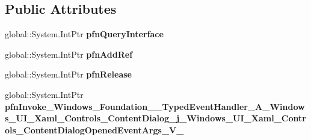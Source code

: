\subsection*{Public Attributes}
\begin{DoxyCompactItemize}
\item 
\mbox{\label{struct_windows_1_1_foundation_1_1_typed_event_handler___a___windows___u_i___xaml___controls___co7eff74cfd44b375ec88a14fae1c258be_aef7949bfc9371f66066b70f37583104c}} 
global\+::\+System.\+Int\+Ptr {\bfseries pfn\+Query\+Interface}
\item 
\mbox{\label{struct_windows_1_1_foundation_1_1_typed_event_handler___a___windows___u_i___xaml___controls___co7eff74cfd44b375ec88a14fae1c258be_a1665238f933bb5659d4d4dab1a7398eb}} 
global\+::\+System.\+Int\+Ptr {\bfseries pfn\+Add\+Ref}
\item 
\mbox{\label{struct_windows_1_1_foundation_1_1_typed_event_handler___a___windows___u_i___xaml___controls___co7eff74cfd44b375ec88a14fae1c258be_a6546c3c1c4ae39dadb502075cb8e2ec7}} 
global\+::\+System.\+Int\+Ptr {\bfseries pfn\+Release}
\item 
\mbox{\label{struct_windows_1_1_foundation_1_1_typed_event_handler___a___windows___u_i___xaml___controls___co7eff74cfd44b375ec88a14fae1c258be_a43032b6fcb99773fddf63be6ecf1de44}} 
global\+::\+System.\+Int\+Ptr {\bfseries pfn\+Invoke\+\_\+\+Windows\+\_\+\+Foundation\+\_\+\+\_\+\+Typed\+Event\+Handler\+\_\+\+A\+\_\+\+Windows\+\_\+\+U\+I\+\_\+\+Xaml\+\_\+\+Controls\+\_\+\+Content\+Dialog\+\_\+j\+\_\+\+Windows\+\_\+\+U\+I\+\_\+\+Xaml\+\_\+\+Controls\+\_\+\+Content\+Dialog\+Opened\+Event\+Args\+\_\+\+V\+\_\+}
\end{DoxyCompactItemize}
